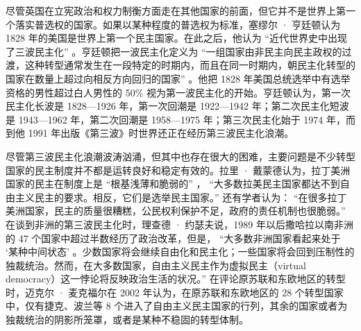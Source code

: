 尽管英国在立宪政治和权力制衡方面走在其他国家的前面，但它并不是世界上第一个落实普选权的国家。如果以某种程度的普选权为标准，塞缪尔 · 亨廷顿认为 1828 年的美国是世界上第一个民主国家。在此之后，他认为 “近代世界史中出现了三波民主化” 。亨廷顿把一波民主化定义为 “一组国家由非民主向民主政权的过渡，这种转型通常发生在一段特定的时期内，而且在同一时期内，朝民主化转型的国家在数量上超过向相反方向回归的国家” 。他把 1828 年美国总统选举中有选举资格的男性超过白人男性的 50\% 视为第一波民主化的开始。亨廷顿认为，第一次民主化长波是 1828—1926 年，第一次回潮是 1922—1942 年；第二次民主化短波是 1943—1962 年，第二次回潮是 1958—1975 年；第三次民主化始于 1974 年，而到他 1991 年出版《第三波》时世界还正在经历第三波民主化浪潮。

尽管第三波民主化浪潮波涛汹涌，但其中也存在很大的困难，主要问题是不少转型国家的民主制度并不都是运转良好和稳定有效的。拉里 · 戴蒙德认为，拉丁美洲国家的民主在制度上是 “根基浅薄和脆弱的” ， “大多数拉美民主国家都达不到自由主义民主的要求。相反，它们是选举民主国家。” 还有学者认为： “在很多拉丁美洲国家，民主的质量很糟糕，公民权利保护不足，政府的责任机制也很脆弱。” 在谈到非洲的第三波民主化时，理查德 · 约瑟夫说，1989 年以后撒哈拉以南非洲的 47 个国家中超过半数经历了政治改革，但是， “大多数非洲国家看起来处于 ‘某种中间状态’ 。少数国家将会继续自由化和民主化；一些国家将会回到压制性的独裁统治。然而，在大多数国家，自由主义民主作为虚拟民主（virtual democracy）这一悖论将反映政治生活的状况。” 在评论原苏联和东欧地区的转型时，迈克尔 · 麦克福尔在 2002 年认为，在原苏联和东欧地区的 28 个转型国家中，仅有捷克、波兰等 8 个进入了自由主义民主国家的行列，其余的国家或者为独裁统治的阴影所笼罩，或者是某种不稳固的转型体制。

